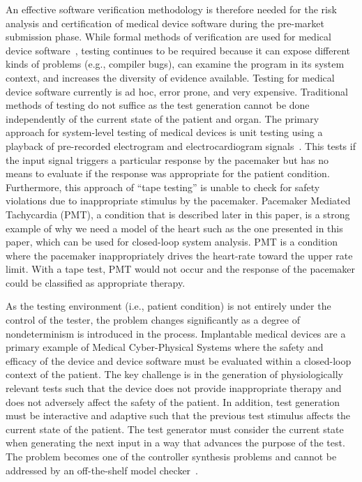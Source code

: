 An effective software verification methodology is therefore needed for the risk analysis and certification of medical device software during the pre-market submission phase. While formal methods of verification are used for medical device software~\cite{challenge, challenge2, challenge3}, testing continues to be required because it can expose different kinds of problems (e.g., compiler bugs), can examine the program in its system context, and increases the diversity of evidence available. Testing for medical device software currently is ad hoc, error prone, and very expensive. Traditional methods of testing do not suffice as the test generation cannot be done independently of the current state of the patient and organ. The primary approach for system-level testing of medical devices is unit testing using a playback of pre-recorded electrogram and electrocardiogram signals~\cite{testing_imd, Vip}. This tests if the input signal triggers a particular response by the pacemaker but has no means to evaluate if the response was appropriate for the patient condition. Furthermore, this approach of ``tape testing'' is unable to check for safety violations due to inappropriate stimulus by the pacemaker. Pacemaker Mediated Tachycardia (PMT), a condition that is described later in this paper, is a strong example of why we need a model of the heart such as the one presented in this paper, which can be used for closed-loop system analysis. 
PMT is a condition where the pacemaker inappropriately drives the heart-rate toward the upper rate limit. With a tape test, PMT would not occur and the response of the pacemaker could be classified as appropriate therapy.

As the testing environment (i.e., patient condition) is not entirely under the control of the tester, the problem changes significantly as a degree of nondeterminism is introduced in the process. Implantable medical devices are a primary example of Medical Cyber-Physical Systems where the safety and efficacy of the device and device software must be evaluated within a closed-loop context of the patient. The key challenge is in the generation of physiologically relevant tests such that the device does not provide inappropriate therapy and does not adversely affect the safety of the patient. In addition, test generation must be interactive and adaptive such that the previous test stimulus affects the current state of the patient. The test generator must consider the current state when generating the next input in a way that advances the purpose of the test. The problem becomes one of the controller synthesis problems and cannot be addressed by an off-the-shelf model checker~\cite{rushby}.  
   
